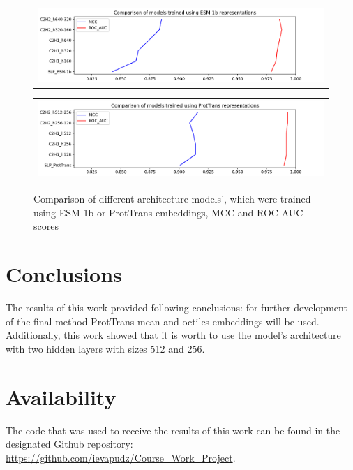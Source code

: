 \documentclass[12pt]{article}
\begin{document}
	\begin{figure}[h!]
		\centering
		\begin{tabular}{@{}c@{}}
			\includegraphics[scale=0.6]{MLP_ESM.png}
		\end{tabular}

		\begin{tabular}{@{}c@{}}
			\includegraphics[scale=0.6]{MLP_PT.png}
		\end{tabular}
		
		\caption{Comparison of different architecture models', which were trained using 
		ESM-1b or ProtTrans embeddings, MCC and ROC AUC scores}
		\label{figure:scoresMLP_ESMandPT}
	\end{figure}

	\newpage

	\section{Conclusions}

	The results of this work provided following conclusions: for 
	further development of the final method ProtTrans mean and 
	octiles embeddings will be used. Additionally, this work 
	showed that it is worth to use the model's architecture with 
	two hidden layers with sizes 512 and 256.

	\section{Availability}

	The code that was used to receive the results of this work can be found
	in the designated Github repository: 
	\href{https://github.com/ievapudz/Course_Work_Project}{https://github.com/ievapudz/Course\_Work\_Project}.

	\newpage
	
	\nocite{*}
	
	\normalsize

 

\end{document}
